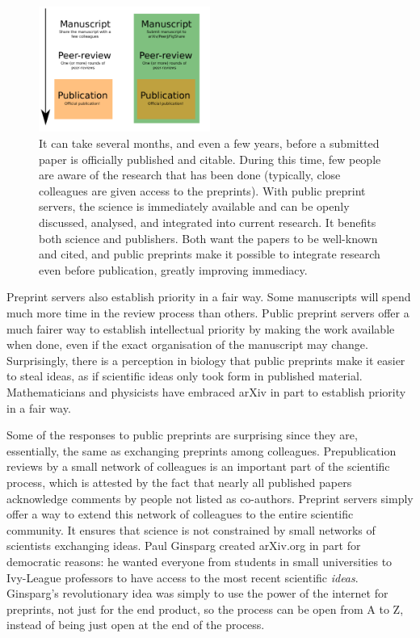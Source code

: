 \documentclass[letterpaper,twocolumn,superscriptaddress,showkeys]{revtex4}
\begin{document}
\begin{figure}[ht!] \centering\includegraphics[width=0.50\textwidth]{map.pdf}
\caption { It can take several months, and even a few years, before a submitted
paper is officially published and citable. During this time, few people are
aware of the research that has been done (typically, close colleagues are
given access to the preprints). With public preprint servers, the science is
immediately available and can be openly discussed, analysed, and integrated
into current research. It benefits both science and publishers. Both want the
papers to be well-known and cited, and public preprints make it possible to
integrate research even before publication, greatly improving immediacy.  }
\label{fig:map}
\end{figure}

Preprint servers also establish priority in a fair way.  Some
manuscripts will spend much more time in the review process than
others.  Public preprint servers offer a much fairer way to establish
intellectual priority by making the work available when done, even if
the exact organisation of the manuscript may change. Surprisingly,
there is a perception in biology that public preprints make it easier
to steal ideas, as if scientific ideas only took form in published
material.
Mathematicians and physicists have embraced arXiv in part to establish
priority in a fair way\cite{cal12}.

Some of the responses to public preprints are surprising since they are,
essentially, the same as exchanging preprints among colleagues.
Prepublication reviews by a small network of colleagues is an
important part of the scientific process, which is attested by the
fact that nearly all published papers acknowledge comments by people
not listed as co-authors.  Preprint servers simply offer a way to
extend this network of colleagues to the entire scientific
community. It ensures that science is not constrained by small
networks of scientists exchanging ideas.  Paul Ginsparg created
arXiv.org in part for democratic reasons: he wanted everyone from
students in small universities to Ivy-League professors to have access
to the most recent scientific \emph{ideas}.
Ginsparg's revolutionary idea was simply to use the power of the
internet for preprints, not just for the end product, so the process
can be open from A to Z, instead of being just open at the end of the
process.
\end{document}

